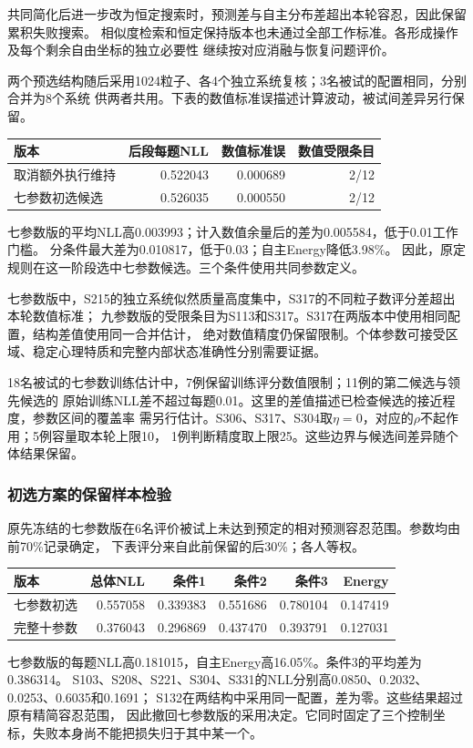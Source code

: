 \documentclass[11pt,a4paper]{article}
\numberwithin{equation}{section}
\begin{document}
共同简化后进一步改为恒定搜索时，预测差与自主分布差超出本轮容忍，因此保留累积失败搜索。
相似度检索和恒定保持版本也未通过全部工作标准。各形成操作及每个剩余自由坐标的独立必要性
继续按对应消融与恢复问题评价。

两个预选结构随后采用1024粒子、各4个独立系统复核；3名被试的配置相同，分别合并为8个系统
供两者共用。下表的数值标准误描述计算波动，被试间差异另行保留。
\begin{center}
\begin{tabularx}{\textwidth}{Y r r r}
\toprule
版本 & 后段每题NLL & 数值标准误 & 数值受限条目\\
\midrule
取消额外执行维持 & 0.522043 & 0.000689 & 2/12 \\
七参数初选候选 & 0.526035 & 0.000550 & 2/12 \\
\bottomrule
\end{tabularx}
\end{center}

七参数版的平均NLL高0.003993；计入数值余量后的差为0.005584，低于0.01工作门槛。
分条件最大差为0.010817，低于0.03；自主Energy降低3.98\%。
因此，原定规则在这一阶段选中七参数候选。三个条件使用共同参数定义。

七参数版中，S215的独立系统似然质量高度集中，S317的不同粒子数评分差超出本轮数值标准；
九参数版的受限条目为S113和S317。S317在两版本中使用相同配置，结构差值使用同一合并估计，
绝对数值精度仍保留限制。个体参数可接受区域、稳定心理特质和完整内部状态准确性分别需要证据。

18名被试的七参数训练估计中，7例保留训练评分数值限制；11例的第二候选与领先候选的
原始训练NLL差不超过每题0.01。这里的差值描述已检查候选的接近程度，参数区间的覆盖率
需另行估计。S306、S317、S304取$\eta=0$，对应的$\rho$不起作用；5例容量取本轮上限10，
1例判断精度取上限25。这些边界与候选间差异随个体结果保留。

\subsubsection{初选方案的保留样本检验}
原先冻结的七参数版在6名评价被试上未达到预定的相对预测容忍范围。参数均由前70\%记录确定，
下表评分来自此前保留的后30\%；各人等权。
\begin{center}
\begin{tabularx}{\textwidth}{Y r r r r r}
\toprule
版本 & 总体NLL & 条件1 & 条件2 & 条件3 & Energy\\
\midrule
七参数初选 & 0.557058 & 0.339383 & 0.551686 & 0.780104 & 0.147419\\
完整十参数 & 0.376043 & 0.296869 & 0.437470 & 0.393791 & 0.127031\\
\bottomrule
\end{tabularx}
\end{center}
七参数版的每题NLL高0.181015，自主Energy高16.05\%。条件3的平均差为0.386314。
S103、S208、S221、S304、S331的NLL分别高0.0850、0.2032、0.0253、0.6035和0.1691；
S132在两结构中采用同一配置，差为零。这些结果超过原有精简容忍范围，
因此撤回七参数版的采用决定。它同时固定了三个控制坐标，失败本身尚不能把损失归于其中某一个。
\end{document}
